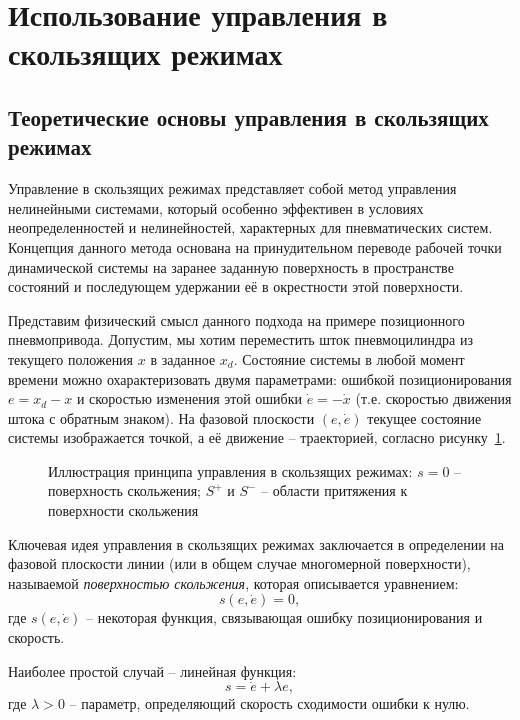 \section{Использование управления в скользящих режимах}\label{sec:ch3/sec3}

\subsection*{Теоретические основы управления в скользящих режимах}\label{subsec:ch3/sec3/sub1}

Управление в скользящих режимах представляет собой метод управления нелинейными системами, который особенно
эффективен в условиях неопределенностей и нелинейностей, характерных для пневматических систем.
Концепция данного метода основана на принудительном переводе рабочей точки динамической
системы на заранее заданную поверхность в пространстве состояний
и последующем удержании её в окрестности этой поверхности.

Представим физический смысл данного подхода на примере позиционного пневмопривода.
Допустим, мы хотим переместить шток пневмоцилиндра из текущего положения $x$ в заданное $x_d$.
Состояние системы в любой момент времени можно охарактеризовать двумя параметрами:
ошибкой позиционирования $e = x_d - x$ и скоростью изменения этой ошибки $\dot{e} = -\dot{x}$
(т.е. скоростью движения штока с обратным знаком). На фазовой плоскости $(e, \dot{e})$ текущее состояние системы изображается
точкой, а её движение – траекторией, согласно рисунку~\ref{fig:phase_plane}.

\begin{figure}[ht]
	\caption{Иллюстрация принципа управления в скользящих режимах: $s=0$ -- поверхность скольжения; $S^+$ и $S^-$ -- области притяжения к поверхности скольжения}
	\label{fig:phase_plane}
\end{figure}

Ключевая идея управления в скользящих режимах заключается в
определении на фазовой плоскости линии (или в общем случае многомерной поверхности), называемой \textit{поверхностью скольжения}, которая описывается уравнением:
\begin{equation}
	s(e, \dot{e}) = 0,
\end{equation}
где $s(e, \dot{e})$ -- некоторая функция, связывающая ошибку позиционирования и скорость.

Наиболее простой случай -- линейная функция:
\begin{equation}
	s = \dot{e} + \lambda e,
\end{equation}
где $\lambda > 0$ -- параметр, определяющий скорость сходимости ошибки к нулю.

